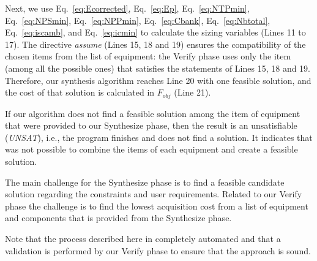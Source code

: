 \documentclass[runningheads]{llncs}
\begin{document}
Next, we use Eq.~\ref{eq:Ecorrected}, Eq.~\ref{eq:Ep}, Eq.~\ref{eq:NTPmin}, Eq.~\ref{eq:NPSmin}, Eq.~\ref{eq:NPPmin}, Eq.~\ref{eq:Cbank}, Eq.~\ref{eq:Nbtotal}, Eq.~\ref{eq:iscamb}, and Eq.~\ref{eq:icmin} to calculate the sizing variables (Lines 11 to 17). The directive \textit{assume} (Lines 15, 18 and 19) ensures the compatibility of the chosen items from the list of equipment: the {\sc Verify} phase uses only the item (among all the possible ones) that satisfies the statements of Lines 15, 18 and 19. Therefore, our synthesis algorithm reaches Line 20 with one feasible solution, and the cost of that solution is calculated in $F_{obj}$ (Line 21). 

If our algorithm does not find a feasible solution among the item of equipment that were provided to our {\sc Synthesize} phase,  then the result is an unsatisfiable (\textit{UNSAT}), i.e., the program finishes and does not find a solution. It indicates that was not possible to combine the items of each equipment and create a feasible solution. 

The main challenge for the {\sc Synthesize} phase is to find a feasible candidate solution regarding the constraints and user requirements. Related to our {\sc Verify} phase the challenge is to find the lowest acquisition cost from a list of equipment and components that is provided from the {\sc Synthesize} phase. 

Note that the process described here in completely automated and that a validation is performed by our {\sc Verify} phase to ensure that the approach is sound.
\end{document}
